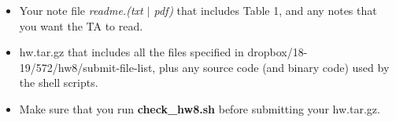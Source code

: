 \documentclass[11pt]{article}
\begin{document}
\begin{itemize}

    \item Your note file {\it readme.(txt $\mid$ pdf)}
    that includes Table 1, and any notes that you want the TA to read.
      

  \item  hw.tar.gz that includes all the files specified in
      dropbox/18-19/572/hw8/submit-file-list, plus any source code
      (and binary code) used by the shell scripts.

  \item Make sure that you run {\bf check\_hw8.sh} before
    submitting your hw.tar.gz.
    

  
  

\end{itemize}
\end{document}
